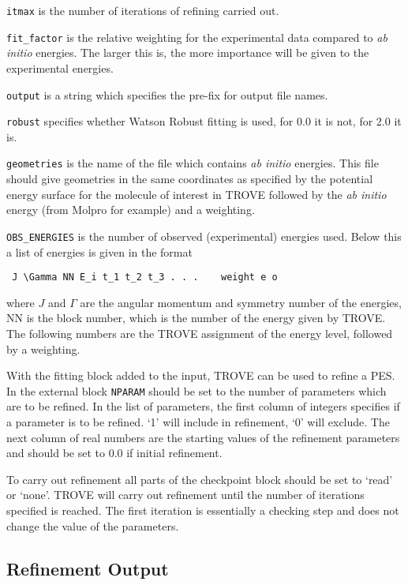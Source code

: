 \verb|itmax| is the number of iterations of refining carried out. 

\verb|fit_factor| is the relative weighting for the experimental data compared to \textit{ab initio} energies. 
The larger this is, the more importance will be given to the
experimental energies. 

\verb|output| is a string which specifies the pre-fix 
for output file names. 

\verb|robust| specifies whether Watson Robust
fitting is used, for 0.0 it is not, for 2.0 it is. 

\verb|geometries| is the name of the file which contains 
\textit{ab initio} energies. This file should give geometries in the
same coordinates as specified by the potential energy surface for the molecule of interest in TROVE 
followed by the \textit{ab initio} energy (from Molpro for example) and a weighting.

\verb|OBS_ENERGIES| is the number of observed (experimental) energies used. Below this a list of energies is given in the format
\begin{verbatim}
 J \Gamma NN E_i t_1 t_2 t_3 . . .    weight e o
\end{verbatim}
where $J$ and $\Gamma$ are the angular momentum and symmetry number of the energies, NN is the block number, 
which is the number of the energy given by TROVE. The following numbers
are the TROVE assignment of the energy level, followed by a weighting. 

With the fitting block added to the input, TROVE can be used to refine a PES. In the external block \verb|NPARAM| 
should be set to the number of parameters which are to be refined.
In the list of parameters, the first column of integers specifies if a parameter is to be refined. `1' 
will include in refinement, `0' will exclude. The next column of
real numbers are the starting values of the refinement parameters and should be set to 0.0 if initial refinement.

To carry out refinement all parts of the checkpoint block should be set to `read' or `none'. TROVE will carry 
out refinement until the number of iterations specified is 
reached. The first iteration is essentially a checking step and does not change the value of the parameters. 
 


\subsection{Refinement Output}


